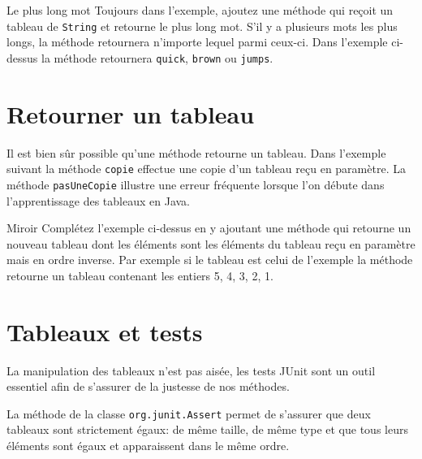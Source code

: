 \documentclass[a4paper,11pt]{style-esi/td}
\begin{document}
	\begin{Exercice}{Le plus long mot}
		Toujours dans l'exemple, ajoutez
		 une méthode  
			qui reçoit un tableau de \texttt{String} et retourne le 
			plus long mot. S'il y a plusieurs mots les plus longs, la méthode
			retournera n'importe lequel parmi ceux-ci. 
			Dans l'exemple ci-dessus la méthode retournera
			 \texttt{quick}, \texttt{brown} ou \texttt{jumps}.
				
	\end{Exercice}
	
	


\section{Retourner un tableau}

	Il est bien sûr possible qu'une méthode retourne un tableau.
	Dans l'exemple suivant la méthode \texttt{copie} 
	effectue une copie d'un tableau reçu en paramètre. 
	La méthode \texttt{pasUneCopie} illustre une erreur fréquente
	lorsque l'on débute dans l'apprentissage des tableaux en Java.
	

	\begin{Exercice}{Miroir}	
		Complétez l'exemple ci-dessus en y ajoutant une méthode 
			qui retourne un nouveau tableau dont les éléments sont les 
			éléments du tableau reçu en paramètre mais en ordre inverse. 
			Par exemple si le tableau est celui de l'exemple la méthode 		
			 retourne un tableau contenant les entiers 5, 4, 3, 2, 1.
	\end{Exercice}



\section{Tableaux et tests}

	La manipulation des tableaux n'est pas aisée, les tests JUnit 
	sont un outil essentiel afin de s'assurer de la justesse de nos méthodes.
	
	La méthode  de la classe \texttt{org.junit.Assert}
	permet de s'assurer que deux tableaux sont strictement égaux: de même taille, 
	de même type et que tous leurs éléments sont égaux et 
	apparaissent dans le même ordre.
\end{document}
